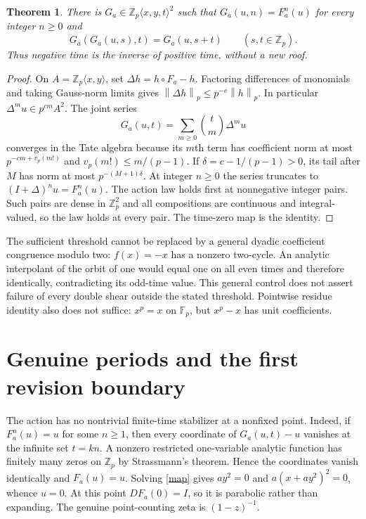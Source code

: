 \documentclass[10pt]{article}
\newtheorem{theorem}{Theorem}
\newcommand{\Zp}{\mathbb Z_p}
\newcommand{\norm}[1]{\left\|#1\right\|_p}
\begin{document}
\begin{theorem}\label{interpolation}
There is $G_a\in\Zp\langle x,y,t\rangle^2$ such that
$G_a(u,n)=F_a^n(u)$ for every integer $n\ge0$ and
\[
 G_a(G_a(u,s),t)=G_a(u,s+t)\qquad(s,t\in\Zp).
\]
Thus negative time is the inverse of positive time, without a new roof.
\end{theorem}
\begin{proof}
On $A=\Zp\langle x,y\rangle$, set $\Delta h=h\circ F_a-h$.
Factoring differences of monomials and taking Gauss-norm limits gives
$\norm{\Delta h}\le p^{-c}\norm h$. In particular
$\Delta^mu\in p^{cm}A^2$. The joint series
\begin{equation}\label{mahler}
 G_a(u,t)=\sum_{m\ge0}\binom tm\Delta^mu
\end{equation}
converges in the Tate algebra because its $m$th term has coefficient
norm at most $p^{-cm+v_p(m!)}$ and
$v_p(m!)\le m/(p-1)$. If $\delta=c-1/(p-1)>0$, its tail after $M$
has norm at most $p^{-(M+1)\delta}$.
At integer $n\ge0$ the series truncates to $(I+\Delta)^nu=F_a^n(u)$.
The action law holds first at nonnegative integer pairs. Such pairs are
dense in $\Zp^2$ and all compositions are continuous and integral-valued,
so the law holds at every pair. The time-zero map is the identity.
\end{proof}

The sufficient threshold cannot be replaced by a general dyadic
coefficient congruence modulo two: $f(x)=-x$ has a nonzero two-cycle.
An analytic interpolant of the orbit of one would equal one on all even
times and therefore identically, contradicting its odd-time value.
This general control does not assert failure of every double shear
outside the stated threshold. Pointwise residue identity also does not
suffice: $x^p=x$ on $\mathbb F_p$, but $x^p-x$ has unit coefficients.

\ifnum{}
\section{Genuine periods and the first revision boundary}
The action has no nontrivial finite-time stabilizer at a nonfixed point.
Indeed, if $F_a^n(u)=u$ for some $n\ge1$, then every coordinate of
$G_a(u,t)-u$ vanishes at the infinite set $t=kn$.
A nonzero restricted one-variable analytic function has finitely many
zeros on $\Zp$ by Strassmann's theorem. Hence the coordinates vanish
identically and $F_a(u)=u$. Solving \eqref{map} gives $ay^2=0$ and
$a(x+ay^2)^2=0$, whence $u=0$.
At this point $DF_a(0)=I$, so it is parabolic rather than expanding.
The genuine point-counting zeta is $(1-z)^{-1}$.
\end{document}
